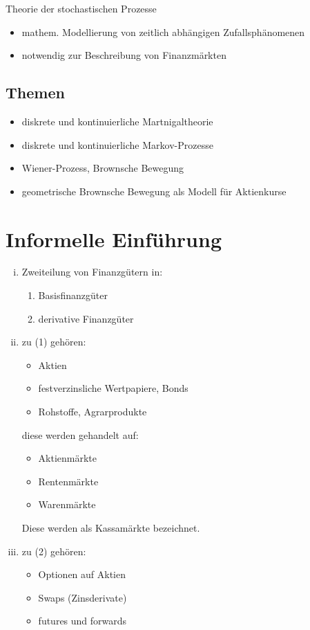 \documentclass[a4paper, pagesize=pdftex, pdftex, twoside, headsepline, index=totoc,toc=listof, fontsize=10pt, cleardoublepage=empty, headinclude, DIV=13, BCOR=13mm]{scrartcl}
\begin{document}
Theorie der stochastischen Prozesse
\begin{itemize}
	\item mathem. Modellierung von zeitlich abhängigen Zufallsphänomenen
	\item notwendig zur Beschreibung von Finanzmärkten
\end{itemize}

\subsection*{Themen} %
\label{sub: themen}

\begin{itemize}
	\item diskrete und kontinuierliche Martnigaltheorie
	\item diskrete und kontinuierliche Markov-Prozesse
	\item Wiener-Prozess, Brownsche Bewegung
	\item geometrische Brownsche Bewegung als Modell für Aktienkurse
\end{itemize}


\newpage

\section{Informelle Einführung} %
\label{sec: informelle_einführung}

\begin{enumerate}[(i)]
	\item Zweiteilung von Finanzgütern in:
	\begin{enumerate}[(1)]
		\item Basisfinanzgüter
		\item derivative Finanzgüter
	\end{enumerate}
	\item zu (1) gehören:
	\begin{itemize}
		\item Aktien
		\item festverzinsliche Wertpapiere, Bonds
		\item Rohstoffe, Agrarprodukte
	\end{itemize}
diese werden gehandelt auf:
	\begin{itemize}
		\item Aktienmärkte
		\item Rentenmärkte
		\item Warenmärkte
	\end{itemize}
Diese werden als Kassamärkte bezeichnet.

	\item zu (2) gehören:
	\begin{itemize}
		\item Optionen auf Aktien
		\item Swaps (Zinsderivate)
		\item futures und forwards
	\end{itemize}

\end{enumerate}
\end{document}
